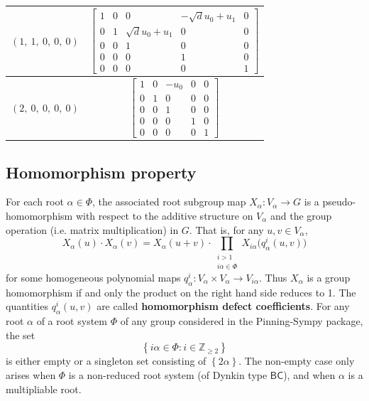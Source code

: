 \documentclass[11pt]{article}
\newcommand{\noi}{\noindent}
\newcommand{\tbf}{\textbf}
\newcommand{\lb}{\left\{}
\newcommand{\rb}{\right\}}
\newcommand{\Z}{\mathbb{Z}}
\theoremstyle{definition}
\begin{document}
\begin{longtable}{|l|c|}
    \hline
    $\left( 1, \  1, \  0, \  0, \  0\right)$ & ${\left[\begin{matrix}1 & 0 & 0 & - \sqrt{d} u_{0} + u_{1} & 0\\0 & 1 & \sqrt{d} u_{0} + u_{1} & 0 & 0\\0 & 0 & 1 & 0 & 0\\0 & 0 & 0 & 1 & 0\\0 & 0 & 0 & 0 & 1\end{matrix}\right]}$ \\
    \hline
    $\left( 2, \  0, \  0, \  0, \  0\right)$ & ${\left[\begin{matrix}1 & 0 & - u_{0} & 0 & 0\\0 & 1 & 0 & 0 & 0\\0 & 0 & 1 & 0 & 0\\0 & 0 & 0 & 1 & 0\\0 & 0 & 0 & 0 & 1\end{matrix}\right]}$ \\
    \hline
\end{longtable}


\subsection{Homomorphism property}

\noi For each root $\alpha \in \Phi$, the associated root subgroup map $X_\alpha:V_\alpha \to G$ is a pseudo-homomorphism with respect to the additive structure on $V_\alpha$ and the group operation (i.e. matrix multiplication) in $G$. That is, for any $u,v \in V_\alpha$,
\begin{equation}
\label{pseudo homomorphism}
	X_\alpha(u) \cdot X_\alpha(v) = X_\alpha(u+v) \cdot \prod_{\substack{i > 1 \\ i \alpha \in \Phi}} X_{i \alpha} \Big( q^i_\alpha(u,v) \Big)
\end{equation}
for some homogeneous polynomial maps $q^i_\alpha:V_\alpha \times V_\alpha \to V_{i \alpha}$. Thus $X_\alpha$ is a group homomorphism if and only the product on the right hand side reduces to 1. The quantities $q^i_\alpha(u,v)$ are called \tbf{homomorphism defect coefficients}. For any root $\alpha$ of a root system $\Phi$ of any group considered in the Pinning-Sympy package, the set
\[
	\lb i \alpha \in \Phi : i \in \Z_{\ge 2} \rb
\]
is either empty or a singleton set consisting of $\lb 2 \alpha \rb$. The non-empty case only arises when $\Phi$ is a non-reduced root system (of Dynkin type $\mathsf{BC}$), and when $\alpha$ is a multipliable root. 
\end{document}
